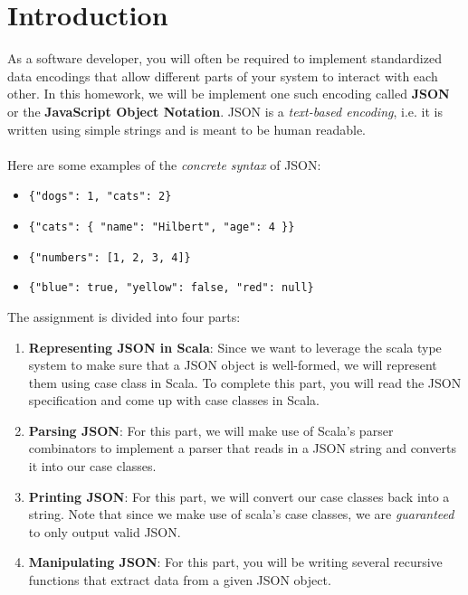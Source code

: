 
\section{Introduction}
As a software developer, you will often be required to implement standardized
data encodings that allow different parts of your system to interact with
each other. In this homework, we will be implement one such encoding called
\textbf{JSON} or the \textbf{JavaScript Object Notation}. JSON is a
\textit{text-based encoding}, i.e. it is written using simple strings and is
meant to be human readable.
\\ \\
Here are some examples of the \textit{concrete syntax} of JSON:
\begin{itemize}
    \item \lstinline|{"dogs": 1, "cats": 2}|
    \item \lstinline|{"cats": { "name": "Hilbert", "age": 4 }}|
    \item \lstinline|{"numbers": [1, 2, 3, 4]}|
    \item \lstinline|{"blue": true, "yellow": false, "red": null}|
\end{itemize}
The assignment is divided into four parts:
\begin{enumerate}
    \item \textbf{Representing JSON in Scala}: Since we want to leverage the
    scala type system to make sure that a JSON object is well-formed, we will
    represent them using case class in Scala. To complete this part, you will
    read the JSON specification and come up with case classes in Scala.
    \item \textbf{Parsing JSON}: For this part, we will make use of Scala's
    parser combinators to implement a parser that reads in a JSON string and
    converts it into our case classes.
    \item \textbf{Printing JSON}: For this part, we will convert our case classes
    back into a string. Note that since we make use of scala's case classes,
    we are \textit{guaranteed} to only output valid JSON.
    \item \textbf{Manipulating JSON}: For this part, you will be writing several
    recursive functions that extract data from a given JSON object.
\end{enumerate}

